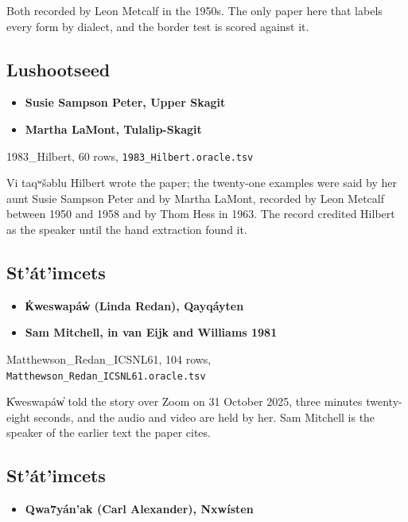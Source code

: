 Both recorded by Leon Metcalf in the 1950s. The only paper here that labels every form by dialect, and the border test is scored against it.

\subsection{Lushootseed}

\begin{itemize}
\item \textbf{Susie Sampson Peter, Upper Skagit}
\item \textbf{Martha LaMont, Tulalip-Skagit}
\end{itemize}

1983\_Hilbert, 60 rows, \texttt{1983\_\allowbreak{}Hilbert.\allowbreak{}oracle.\allowbreak{}tsv}

Vi taqʷšəblu Hilbert wrote the paper; the twenty-one examples were said by her aunt Susie Sampson Peter and by Martha LaMont, recorded by Leon Metcalf between 1950 and 1958 and by Thom Hess in 1963. The record credited Hilbert as the speaker until the hand extraction found it.

\subsection{St'át'imcets}

\begin{itemize}
\item \textbf{K̓weswapáw̓ (Linda Redan), Qayqáyten}
\item \textbf{Sam Mitchell, in van Eijk and Williams 1981}
\end{itemize}

Matthewson\_Redan\_ICSNL61, 104 rows, \texttt{Matthewson\_\allowbreak{}Redan\_\allowbreak{}ICSNL61.\allowbreak{}oracle.\allowbreak{}tsv}

K̓weswapáw̓ told the story over Zoom on 31 October 2025, three minutes twenty-eight seconds, and the audio and video are held by her. Sam Mitchell is the speaker of the earlier text the paper cites.

\subsection{St'át'imcets}

\begin{itemize}
\item \textbf{Qwa7yán'ak (Carl Alexander), Nxwísten}
\end{itemize}

